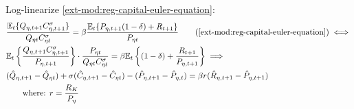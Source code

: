 \documentclass[../thesis.tex]{subfiles}
\begin{document}
Log-linearize \ref{ext-mod:reg-capital-euler-equation}:
\begin{align}
	& \frac{\mathbb{E}_{t} \{ Q_{\eta,t+1} C_{\eta,t+1}^{\sigma} \} }{ Q_{\eta t} C_{\eta t}^{\sigma} } = \beta \frac{ \mathbb{E}_{t} \{ P_{\eta,t+1} (1 - \delta) + R_{t+1} \} }{P_{\eta t}} \tag{\ref{ext-mod:reg-capital-euler-equation}} \iff \\
	& \mathbb{E}_{t} \left\{ \frac{Q_{\eta,t+1} C_{\eta,t+1}^{\sigma}}{P_{\eta,t+1}} \right\} \cdot \frac{P_{\eta t}}{Q_{\eta t} C_{\eta t}^{\sigma}} = \beta \mathbb{E}_{t} \left\{ (1 - \delta) + \frac{R_{t+1}}{P_{\eta, t+1}} \right\} \implies \nonumber \\
	& (\hat{Q}_{\eta, t+1} - \hat{Q}_{\eta t}) + \sigma(\hat{C}_{\eta, t+1} - \hat{C}_{\eta t}) - (\hat{P}_{\eta, t+1} - \hat{P}_{\eta, t}) = \beta r_{}(\hat{R}_{\eta, t+1} - \hat{P}_{\eta, t+1}) \label{ext-mod:reg-ll-capital-euler-equation} \\
	& \qquad \text{where: } r_{} = \frac{R_{K}}{P_{\eta}} \label{ext-mod:reg-rk}
\end{align}

\begin{comment}

\begin{align}
	& \mathbb{E}_{t} \left\{ \frac{Q_{\eta,t+1} C_{\eta,t+1}^{\sigma}}{P_{\eta,t+1}} \right\}
	\cdot \frac{P_{\eta t}}{Q_{\eta t} C_{\eta t}^{\sigma}} = \beta \mathbb{E}_{t} \left\{ (1 - \delta) + $\frac{R_{t+1}}{P_{\eta, t+1}}$ \right\} \nonumber
	\\
	& \frac{P_{\eta t} C_{\eta t}^{1-\sigma}}{Q_{\eta t}} \mathbb{E}_t \left\{ \frac{\te[t+1]}{P_{\eta, t+1} C_{\eta, t+1}^{1-\sigma}} \right\} = \beta \left[ (1-\delta) + \mathbb{E}_t \left\{ \frac{R_{K,t+1}}{P_{\eta, t+1}} \right\} \right] \implies \nonumber \\
	& \frac{P_{\eta} C_{\eta}^{1-\sigma}}{\te[]} \cdot \frac{\te[]}{P_{\eta} C_{\eta}^{1-\sigma}} (1 + \hat{P}_{\eta t} + (1 -\sigma) \hat{C}_{\eta t} - \hat{\mathscr{E}}_{\eta t} + \nonumber \\ 
	& \qquad + \E \{\hat{\mathscr{E}}_{\eta, t+1} - \hat{P}_{\eta, t+1} - (1 -\sigma) \hat{C}_{\eta, t+1}\}) = \nonumber \\
	& \qquad = \beta \left[ (1-\delta) + \frac{R_{K}}{P_{\eta}} \mathbb{E}_t \left\{ 1 + \hat{R}_{K, t+1} -\hat{P}_{\eta, t+1} \right\} \right] \implies \nonumber \\
	& \E \left\{ \hat{\mathscr{E}}_{\eta, t+1} - \hat{P}_{\eta, t+1}  - (1 -\sigma) \hat{C}_{\eta, t+1} \right\} - (\hat{\mathscr{E}}_{\eta t} - \hat{P}_{\eta t} - (1 -\sigma) \hat{C}_{\eta t}) = \nonumber \\
	& \qquad = \beta r_{K} \mathbb{E}_t \left\{ \hat{R}_{K, t+1} - \hat{P}_{\eta, t+1} \right\} \label{ext-mod:reg-ll-capital-euler-equation} \\
	& \qquad \text{where: } r_{K} = \frac{R_{K}}{P_{}} \label{ext-mod:reg-rk}
\end{align}
	
\end{comment}
\end{document}
